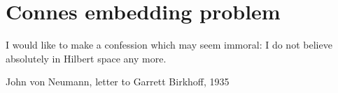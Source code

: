 \section{Connes embedding problem}
\epigraph{I would like to make a confession which may seem immoral: I do not believe absolutely in Hilbert space any more.}{John von Neumann, letter to Garrett Birkhoff, 1935}



